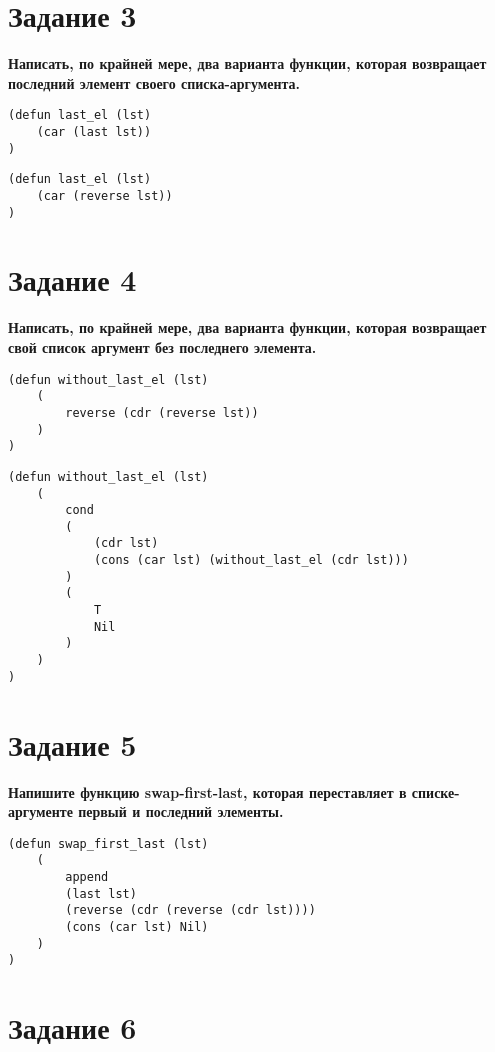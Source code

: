 \documentclass[a4paper,14pt, unknownkeysallowed]{extreport}
\begin{document}
\section*{Задание 3}

\textbf{Написать, по крайней мере, два варианта функции, которая возвращает последний элемент своего списка-аргумента.}

\begin{lstlisting}
(defun last_el (lst)
	(car (last lst))
)
\end{lstlisting}

\begin{lstlisting}
(defun last_el (lst)
	(car (reverse lst))
)
\end{lstlisting}

\newpage

\section*{Задание 4}

\textbf{Написать, по крайней мере, два варианта функции, которая возвращает свой список аргумент без последнего элемента.}

\begin{lstlisting}
(defun without_last_el (lst)
	(
		reverse (cdr (reverse lst))
	)
)
\end{lstlisting}

\begin{lstlisting}
(defun without_last_el (lst)
	(
		cond 
		(
			(cdr lst) 
			(cons (car lst) (without_last_el (cdr lst)))
		)
		(
			T
			Nil
		)
	)
)
\end{lstlisting}

\section*{Задание 5}

\textbf{Напишите функцию swap-first-last, которая переставляет в списке-аргументе первый и последний элементы.}

\begin{lstlisting}
(defun swap_first_last (lst)
	(
		append 
		(last lst)
		(reverse (cdr (reverse (cdr lst))))
		(cons (car lst) Nil)
	)
)
\end{lstlisting}

\section*{Задание 6}
\end{document}
